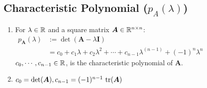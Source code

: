 \subsection{Characteristic Polynomial ($p_A(\lambda)$)}

\begin{enumerate}
    \item 
    \begin{definition}
        For $\lambda \in \mathbb{R}$ and a square matrix $\bm{A} \in \mathbb{R}^{n\times n}$:
        \\
        $
            \begin{aligned}
                p_{\bm{A}}(\lambda ) &:= \det(\bm{A} - \lambda \bm{I}) \\
                &= c_0 + c_1\lambda  + c_2\lambda  ^2 + \cdots + c_{n-1}\lambda ^{( n-1)} + (-1)^n\lambda^  n
            \end{aligned}
        $
        \\
        $c_0, \cdots , c_{n-1} \in \mathbb{R}$, is the characteristic polynomial of $\bm{A}$.
    \end{definition}

    \item $c_0 = \det(\bm{A}), c_{n-1} = (-1)^{n-1}\ \text{tr}(\bm{A})$
\end{enumerate}









